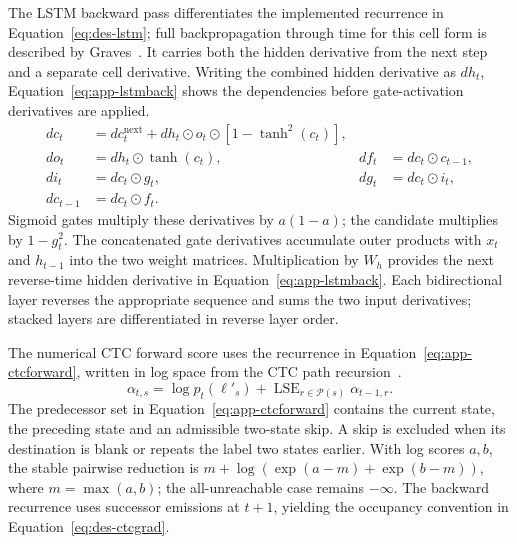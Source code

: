 The LSTM backward pass differentiates the implemented recurrence in Equation~\ref{eq:des-lstm}; full backpropagation through time for this cell form is described by Graves~\cite[pp.~4--5]{graves2013}. It carries both the hidden derivative from the next step and a separate cell derivative. Writing the combined hidden derivative as $d h_t$, Equation~\ref{eq:app-lstmback} shows the dependencies before gate-activation derivatives are applied.
\begin{equation}
\begin{aligned}
d c_t&=d c_t^{\mathrm{next}}+d h_t\odot o_t\odot[1-\tanh^2(c_t)],\\
d o_t&=d h_t\odot\tanh(c_t),& d f_t&=d c_t\odot c_{t-1},\\
d i_t&=d c_t\odot g_t,&d g_t&=d c_t\odot i_t,\\
d c_{t-1}&=d c_t\odot f_t.
\end{aligned}
\label{eq:app-lstmback}
\end{equation}
Sigmoid gates multiply these derivatives by $a(1-a)$; the candidate multiplies by $1-g_t^2$. The concatenated gate derivatives accumulate outer products with $x_t$ and $h_{t-1}$ into the two weight matrices. Multiplication by $W_h$ provides the next reverse-time hidden derivative in Equation~\ref{eq:app-lstmback}. Each bidirectional layer reverses the appropriate sequence and sums the two input derivatives; stacked layers are differentiated in reverse layer order.

The numerical CTC forward score uses the recurrence in Equation~\ref{eq:app-ctcforward}, written in log space from the CTC path recursion~\cite[PDF p.~4, Sec.~4.1]{graves2006}.
\begin{equation}
\alpha_{t,s}=\log p_t(\ell'_s)+
\operatorname{LSE}_{r\in\mathcal P(s)}\alpha_{t-1,r}.
\label{eq:app-ctcforward}
\end{equation}
The predecessor set in Equation~\ref{eq:app-ctcforward} contains the current state, the preceding state and an admissible two-state skip. A skip is excluded when its destination is blank or repeats the label two states earlier. With log scores $a,b$, the stable pairwise reduction is $m+\log(\exp(a-m)+\exp(b-m))$, where $m=\max(a,b)$; the all-unreachable case remains $-\infty$. The backward recurrence uses successor emissions at $t+1$, yielding the occupancy convention in Equation~\ref{eq:des-ctcgrad}.

